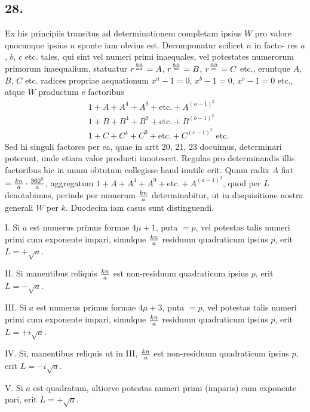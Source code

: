 \documentclass[twoside,12pt, showframe]{memoir}
\let\oldfrac\frac
\def\frac#1#2{\mathchoice{\tfrac{#1}{#2}}{\oldfrac{#1}{#2}}{\genfrac{}{}{}{2}{#1}{#2\mathstrut}}{\genfrac{}{}{}{3}{#1}{#2\mathstrut}}}
\begin{document}
\subsection*{28.}
 
Ex his principiis transitus ad determinationem completam ipsius \(W\) pro valore quocunque ipsius \(n\) sponte iam obvius est. Decomponatur scilicet \(n\) in facto-\clearpage\noindent%
res \(a\), \(b\), \(c\) etc. tales, qui sint vel numeri primi inaequales, vel potestates numerorum primorum inaequalium, statuatur \(r^{\frac{n n}{a a}}=A\), \(r^{\frac{n n}{b b}}=B\), \(r^{\frac{n n}{c c}}=C\) etc., eruntque \(A\), \(B\), \(C\) etc. radices propriae aequationum \(x^{a}-1=0\), \(x^{b}-1=0\), \(x^{c}-1=0\) etc., atque \(W\) productum e factoribus
\[\begin{aligned}
& 1+A+A^{4}+A^{9}+\text{etc.}+A^{(u-1)^{2}} \\
& 1+B+B^{4}+B^{9}+\text{etc.}+B^{(b-1)^{2}} \\
& 1+C+C^{4}+C^{9}+\text{etc.}+C^{(c-1)^{2}} \text{ etc.}
\end{aligned}\]
Sed hi singuli factores per ea, quae in artt 20, 21, 23 docuimus, determinari poterunt, unde etiam valor producti innotescet. Regulas pro determinandis illis factoribus hic in unum obtutum collegisse haud inutile erit. Quum radix \(A\) fiat \(=\frac{k n}{a} \cdot \frac{360^{0}}{a}\), aggregatum \(1+A+A^{4}+A^{9}+\text{etc.}+A^{(a-1)^{2}}\), quod per \(L\) denotabimus, perinde per numerum \(\frac{k n}{a}\) determinabitur, ut in disquisitione nostra generali \({W}\) per \(k\). Duodecim iam casus sunt distinguendi.
 
I. Si \(a\) est numerus primus formae \(4 \mu+1\), puta \(=p\), vel potestas talis numeri primi cum exponente impari, simulque \(\frac{k n}{a}\) residuum quadraticum ipsius \(p\), erit \(L=+\surd a\).
 
II. Si manentibus reliquis \(\frac{k n}{a}\) est non-residuum quadraticum ipsius \(p\), erit \(L=-\surd a\).
 
III. Si \(a\) est numerus primus formae \(4 \mu+3\), puta \(=p\), vel potestas talis numeri primi cum exponente impari, simulque \(\frac{k n}{a}\) residuum quadraticum ipsius \(p\), erit \(L=+i \surd a\).
 
IV. Si, manentibus reliquis ut in III, \(\frac{k n}{a}\) est non-residuum quadraticum ipsius \(p\), erit \(L=-i \surd a\).
 
V. Si \(a\) est quadratum, altiorve potestas numeri primi (imparis) cum exponente pari, erit \(L=+\surd a\).
 
\end{document}
